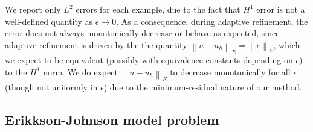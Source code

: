 \documentclass[final,leqno]{siamltex}
\newcommand{\nor}[1]{\left\| #1 \right\|}
\begin{document}
We report only $L^2$ errors for each example, due to the fact that $H^1$ error is not a well-defined quantity as $\epsilon \rightarrow 0$.  As a consequence, during adaptive refinement, the error does not always monotonically decrease or behave as expected, since adaptive refinement is driven by the the quantity $\nor{u-u_h}_E = \nor{e}_V$, which we expect to be equivalent (possibly with equivalence constants depending on $\epsilon$) to the $H^1$ norm.  We do expect $\nor{u-u_h}_E$ to decrease monotonically for all $\epsilon$ (though not uniformly in $\epsilon$) due to the minimum-residual nature of our method.  

\subsection{Erikkson-Johnson model problem}
\end{document}
